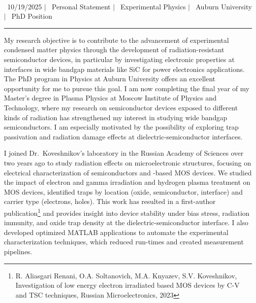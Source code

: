\documentclass[a4paper,12pt]{article}
\begin{document}
\begin{center}
    {\Huge \scshape {\fontsize{25}{30}\selectfont{Reza}} {\fontsize{25}{30}}} \\ \vspace{3pt}
    {\small \raisebox{-0.2\height}\ {10/19/2025}} $|$
    {\small \raisebox{-0.2\height}\ {Personal Statement}} $|$
    {\small \raisebox{-0.2\height}\ {Experimental Physics}} $|$
    {\small \raisebox{-0.2\height}\ {Auburn University}} $|$
    {\small \raisebox{-0.2\height}\ {PhD Position}}
    \vspace{-10pt}
\end{center}
\vspace{-10pt}
\noindent\rule{\textwidth}{0.5pt}

My research objective is to contribute to the advancement of experimental condensed matter physics through the development of radiation-resistant semiconductor devices, in particular by investigating electronic properties at interfaces in wide bandgap materials like SiC for power electronics applications. The PhD program in Physics at Auburn University offers an excellent opportunity for me to pursue this goal. I am now completing the final year of my Master’s degree in Plasma Physics at Moscow Institute of Physics and Technology, where my research on semiconductor devices exposed to different kinds of radiation has strengthened my interest in studying wide bandgap semiconductors. I am especially motivated by the possibility of exploring trap passivation and radiation damage effects at dielectric-semiconductor interfaces.
\vspace{10pt}

I joined Dr.\ Koveshnikov's laboratory in the Russian Academy of Sciences over two years ago to study radiation effects on microelectronic structures, focusing on electrical characterization of semiconductors and -based MOS devices. We studied the impact of electron and gamma irradiation and hydrogen plasma treatment on MOS devices, identified traps by location (oxide, semiconductor, interface) and carrier type (electrons, holes). This work has resulted in a first-author publication\footnote{R. Aliasgari Renani, O.A. Soltanovich, M.A. Knyazev, S.V. Koveshnikov, Investigation of low energy electron irradiated  based MOS devices by C-V and TSC techniques, Russian Microelectronics, 2023} and provides insight into device stability under bias stress, radiation immunity, and oxide trap density at the dielectric-semiconductor interface. I also developed optimized MATLAB applications to automate the experimental characterization techniques, which reduced run-times and created measurement pipelines.
\vspace{10pt}
\end{document}
